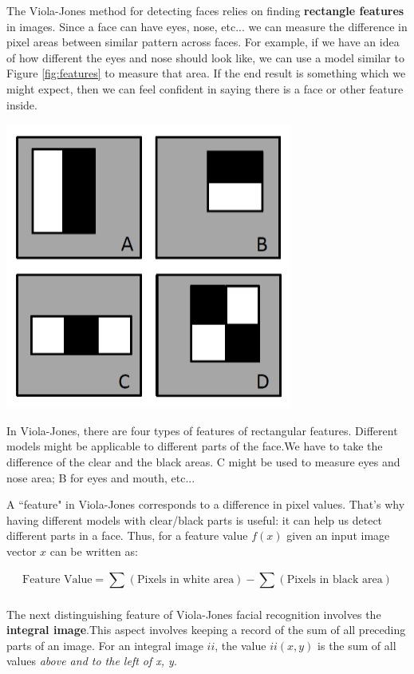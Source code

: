 \documentclass{tufte-handout}
\begin{document}
The Viola-Jones method for detecting faces relies on finding \textbf{rectangle features} in images.
Since a face can have eyes, nose, etc... we can measure the difference in pixel areas between similar pattern
across faces. For example, if we have an idea of how different the eyes and nose should look like, we can use
a model similar to Figure \ref{fig:features} to measure that area. If the end result is something which we might
expect, then we can feel confident in saying there is a face or other feature inside.

\begin{marginfigure}
		\includegraphics[scale=0.3]{rect_features}	
		\caption{In Viola-Jones, there are four types of features of rectangular features. Different
			models might be applicable to different parts of the face.We have to take
			the difference of the clear and the black areas. C might be used to measure eyes and nose area;
			B for eyes and mouth, etc...
			\label{fig:features}
			}
\end{marginfigure}

A ``feature" in Viola-Jones corresponds to a difference in pixel values. That's why having different models
with clear/black parts is useful: it can help us detect different parts in a face. Thus, for a feature value
$f(x)$ given an input image vector $x$ can be written as:

\[ \textrm{Feature Value} = \sum{}^{}(\textrm{Pixels in white area}) - \sum_{}^{}(\textrm{Pixels in black area}) \]

The next distinguishing feature of Viola-Jones facial recognition involves the \textbf{integral image}.This
aspect involves keeping a record of the sum of all preceding parts of an image. For an integral image $ii$,
the value $ii(x, y)$ is the sum of all values \textit{above and to the left of x, y}. 
\end{document}

